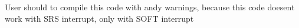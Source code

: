 
\begin{DoxyRefList}
\item[\label{bug__bug000001}%
\Hypertarget{bug__bug000001}%
Global \hyperlink{main_8c_a52d2cba30e6946c95578be946ac12a65}{main} (void)]User should to compile this code with andy warnings, because this code doesen\textquotesingle{}t work with S\+RS interrupt, only with S\+O\+FT interrupt 
\end{DoxyRefList}